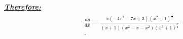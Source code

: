 \documentclass{report}
\begin{document}
    \pagebreak \bigbreak \noindent
    \begin{mdframed}
        \textbf{\textbf{\textit{\underline{Therefore:}}}}
        \begin{align*}
          \boxed{\frac{dy}{dx} = \frac{x(-4x^{3}-7x+3)(x^{2}+1)^{\frac{1}{2}}}{(x+1)(x^{2}-x-x^{2})(x^{3}+1)^{\frac{7}{4}}}} \\
        .\end{align*}
    \end{mdframed}
\end{document}
